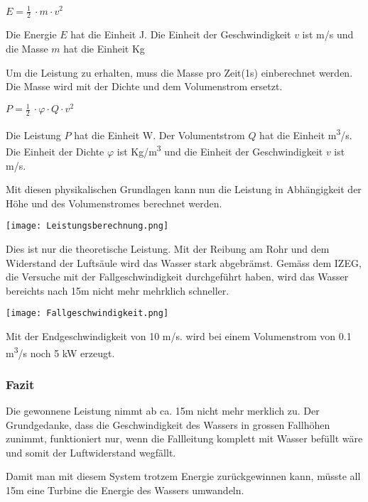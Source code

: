 \begin{center}
\(E =\frac 12\ \cdot m \cdot v^2\)
\end{center}

Die Energie \(E\) hat die Einheit \si{J}. Die Einheit der Geschwindigkeit \(v\) ist \si{m/s} und die Masse \(m\) hat die Einheit \si{Kg}

\newpage

Um die Leistung zu erhalten, muss die Masse pro Zeit(1s) einberechnet werden. Die Masse wird  mit der Dichte und dem Volumenstrom ersetzt.

\begin{center}
\(P =\frac 12\ \cdot \varphi \cdot Q \cdot v^2\)
\end{center}

Die Leistung \(P\) hat die Einheit \si{W}. Der Volumentstrom \(Q\) hat die Einheit \si{m^3/s}. Die Einheit der Dichte \(\varphi\) ist \si{Kg/m^3} und die Einheit der Geschwindigkeit \(v\) ist \si{m/s}.
\newline 
\newline
 \newline


Mit diesen physikalischen Grundlagen kann nun die Leistung in Abhängigkeit der Höhe und des Volumenstromes berechnet werden. 

\begin{center}
\texttt{[image: Leistungsberechnung.png]}
\end{center}

Dies ist nur die theoretische Leistung. Mit der Reibung am Rohr und dem Widerstand der Luftsäule wird das Wasser stark abgebrämst. Gemäss dem IZEG, die Versuche mit der Fallgeschwindigkeit durchgeführt haben, wird das Wasser bereichts nach 15m nicht mehr mehrklich schneller.

\begin{center}
\texttt{[image: Fallgeschwindigkeit.png]}
\end{center}

Mit der Endgeschwindigkeit von 10 \si{m/s}. wird bei einem Volumenstrom von 0.1 \si{m^3/s} noch 5 \si{kW} erzeugt.

\subsubsection{Fazit}

Die gewonnene Leistung nimmt ab ca. 15m nicht mehr merklich zu. Der Grundgedanke, dass die Geschwindigkeit des Wassers in grossen Fallhöhen zunimmt, funktioniert nur, wenn die Fallleitung komplett mit Wasser befüllt wäre und somit der Luftwiderstand wegfällt.

Damit man mit diesem System trotzem Energie zurückgewinnen kann, müsste all 15m eine Turbine die Energie des Wassers umwandeln.

\clearpage 





